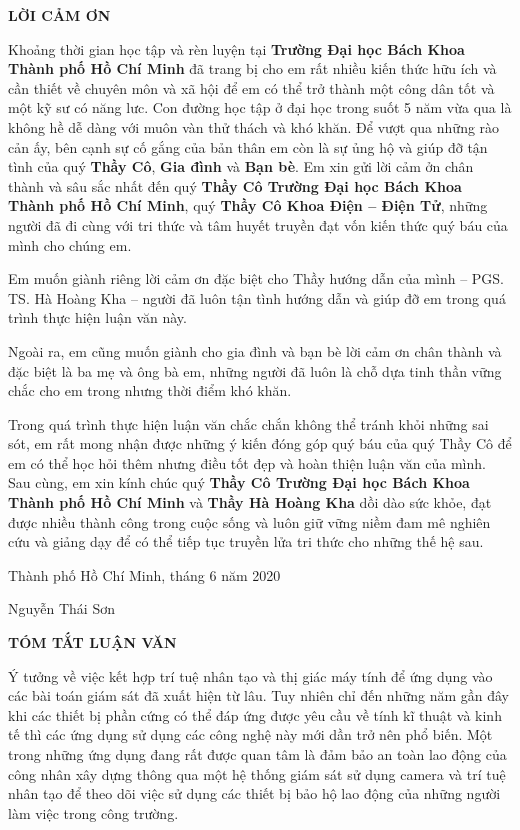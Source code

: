 \documentclass[12pt]{report}
\begin{document}
%
\begin{center}
{\LARGE\bfseries LỜI CẢM ƠN}
\end{center}
Khoảng thời gian học tập và rèn luyện tại \textbf{Trường Đại học Bách Khoa
Thành phố Hồ Chí Minh} đã trang bị cho em rất nhiều kiến thức hữu ích và cần thiết
về chuyên môn và xã hội để em có thể trở thành một công dân tốt và một kỹ sư
có năng lưc. Con đường học tập ở đại học trong suốt 5 năm vừa qua là không 
hề dễ dàng với muôn vàn thử thách và khó khăn. Để vượt qua những rào cản ấy, bên 
cạnh sự cố gắng của bản thân em còn là sự ủng hộ và giúp đỡ tận tình của quý \textbf{Thầy Cô}, 
\textbf{Gia đình} và \textbf{Bạn bè}. Em xin gửi lời cảm ởn chân thành và sâu sắc nhất 
đến quý \textbf{Thầy Cô Trường Đại học Bách Khoa Thành phố Hồ Chí Minh}, quý 
\textbf{Thầy Cô Khoa Điện – Điện Tử}, những người đã đi cùng với tri thức và 
tâm huyết truyền đạt vốn kiến thức quý báu của mình cho chúng em.

Em muốn giành riêng lời cảm ơn đặc biệt cho Thầy hướng dẫn của mình
– PGS. TS. Hà Hoàng Kha – người đã luôn tận tình hướng dẫn và giúp đỡ em trong
quá trình thực hiện luận văn này.

Ngoài ra, em cũng muốn giành cho gia đình và bạn bè lời cảm ơn chân thành và đặc
biệt là ba mẹ và ông bà em, những người đã luôn là chỗ dựa tinh thần vững chắc 
cho em trong nhưng thời điểm khó khăn.

Trong quá trình thực hiện luận văn chắc chắn không thể tránh khỏi những sai
sót, em rất mong nhận được những ý kiến đóng góp quý báu của quý Thầy
Cô để em có thể học hỏi thêm nhưng điều tốt đẹp và hoàn thiện luận văn của mình.
Sau cùng, em xin kính chúc quý \textbf{Thầy Cô Trường Đại học Bách Khoa Thành
phố Hồ Chí Minh} và \textbf{Thầy Hà Hoàng Kha} dồi dào sức khỏe, đạt được nhiều thành
công trong cuộc sống và luôn giữ vững niềm đam mê nghiên cứu và giảng dạy để có thể
tiếp tục truyền lửa tri thức cho những thế hệ sau.

\hfill
Thành phố Hồ Chí Minh, tháng 6 năm 2020

\vspace{0.5cm}

\hfill
Nguyễn Thái Sơn

\newpage
%
\pagestyle{empty}
\begin{center}
{\LARGE\bfseries TÓM TẮT LUẬN VĂN}
\end{center}
Ý tưởng về việc kết hợp trí tuệ nhân tạo và thị giác máy tính để ứng dụng vào các bài 
toán giám sát đã xuất hiện từ lâu. Tuy nhiên chỉ đến những năm gần đây khi các thiết bị
phần cứng có thể đáp ứng được yêu cầu về tính kĩ thuật và kinh tế thì các ứng dụng 
sử dụng các công nghệ này mới dần trở nên phổ biến. Một trong những ứng dụng đang rất được 
quan tâm là đảm bảo an toàn lao động của công nhân xây dựng thông qua một hệ thống giám 
sát sử dụng camera và trí tuệ nhân tạo để theo dõi việc sử dụng các thiết bị bảo hộ lao 
động của những người làm việc trong công trường.
\end{document}

